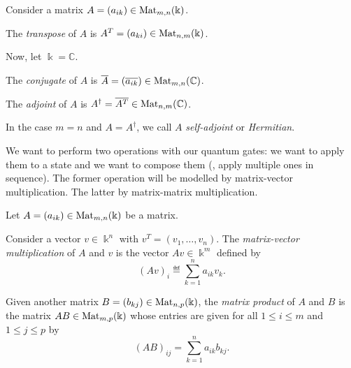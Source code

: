 \documentclass[a4paper, oneside, 12pt]{amsart}
\begin{document}
\begin{definition}\label{def:adjoint}
  Consider a matrix \( A = (a_{ik}) \in \operatorname{Mat}_{m,n}(  \Bbbk) \).
  \begin{thmlist}
    \item The \emph{transpose} of \( A \) is \( A^T = (a_{ki}) \in \operatorname{Mat}_{n,m}(\mathbb{  \Bbbk}) \).
  \end{thmlist}
  Now, let \(  \Bbbk= \mathbb{C}\).
  \begin{thmlist}[resume]
    \item The \emph{conjugate} of \( A \) is \( \overline{A} = (\overline{a_{ik}}) \in \operatorname{Mat}_{m,n}(\mathbb{C}) \).
    \item The \emph{adjoint} of \( A \) is \( A^\dagger = \overline{A^T} \in \operatorname{Mat}_{n,m}(\mathbb{C}) \).
  \end{thmlist}
  In the case \( m = n \) and \( A = A^\dagger \), we call \( A \) \emph{self-adjoint} or \emph{Hermitian}.
\end{definition}


We want to perform two operations with our quantum gates:
we want to apply them to a state and we want to compose them (\ie, apply multiple ones in sequence).
The former operation will be modelled by matrix-vector multiplication.
The latter by matrix-matrix multiplication.

\begin{definition}\label{def:matrix-multiplication}
  Let \( A = (a_{ik}) \in \operatorname{Mat}_{m,n}(\Bbbk) \) be a matrix.
  \begin{thmlist}
    \item Consider a vector \(v\in \Bbbk^{n}\) with \(v^{T}= (v_{1}, \dots , v_{n})\).
    The \emph{matrix-vector multiplication} of \(A\) and \(v\) is the vector \(Av \in \Bbbk^{m}\) defined by
    \begin{equation}
      (Av)_{i} \eqdef \sum_{k=1}^{n} a_{ik} v_{k}.
    \end{equation}
    \item Given another matrix \( B = (b_{kj}) \in \operatorname{Mat}_{n,p}(\Bbbk) \), the \emph{matrix product} of \(A\) and \(B\) is the matrix \( AB \in \operatorname{Mat}_{m,p}(\Bbbk) \) whose entries are given for all \(1\leq i \leq m\) and \(1\leq j \leq p\) by
    \begin{equation*}
      (AB)_{ij} = \sum_{k=1}^n a_{ik} b_{kj}.
    \end{equation*}
  \end{thmlist}
\end{definition}
\end{document}
